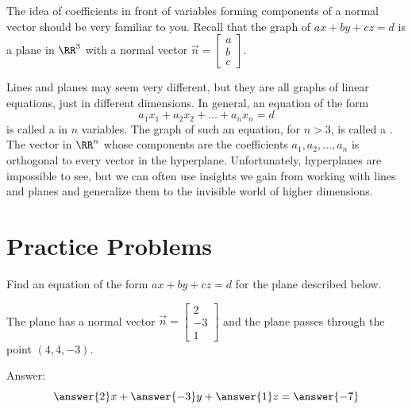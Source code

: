 \documentclass{ximera}
\begin{document}

\begin{onlineOnly}
\begin{center} 
\end{center}
\end{onlineOnly}

The idea of coefficients in front of variables forming components of a normal vector should be very familiar to you.  Recall that the graph of $ax+by+cz=d$ is a plane in $\RR^3$ with a normal vector $\vec{n}=\begin{bmatrix}a\\b\\c\end{bmatrix}$.

Lines and planes may seem very different, but they are all graphs of linear equations, just in different dimensions.  In general, an equation of the form
$$a_1x_1+a_2x_2+\dots +a_nx_n=d$$
is called a  in $n$ variables.  The graph of such an equation, for $n>3$, is called a .  The vector in $\RR^n$ whose components are the coefficients $a_1, a_2, \dots ,a_n$ is orthogonal to every vector in the hyperplane.  Unfortunately, hyperplanes are impossible to see, but we can often use insights we gain from working with lines and planes and generalize them to the invisible world of higher dimensions.


\section*{Practice Problems}

\begin{problem}\label{prob:eqplane1}  Find an equation of the form $ax+by+cz=d$ for the plane described below.
  
  The plane has a normal vector $\vec{n}=\begin{bmatrix}2\\-3\\1\end{bmatrix}$ and the plane passes through the point $(4, 4, -3)$.
  
  Answer: $$\answer{2}x+\answer{-3}y+\answer{1}z=\answer{-7}$$
  \end{problem}
  
\end{document}

